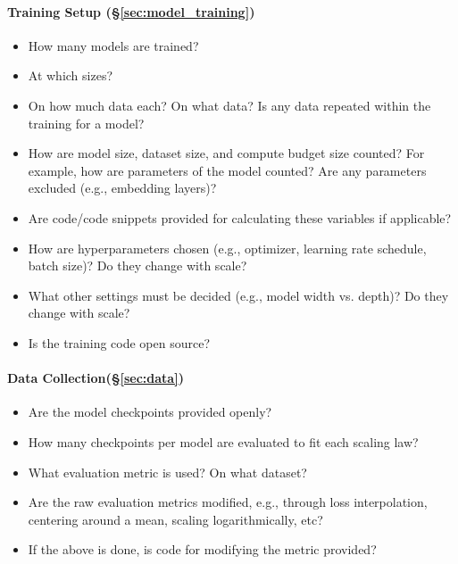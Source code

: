 {\begin{minipage}{38em}
\begin{minipage}[t]{0.48\textwidth}
\paragraph{Training Setup (\S\ref{sec:model_training})}
\begin{itemize}[leftmargin=*]
    \item How many models are trained?
    \item At which sizes?
    \item On how much data each? On what data? Is any data repeated within the training for a model?
    \item How are model size, dataset size, and compute budget size counted? For example, how are parameters of the model counted? Are any parameters excluded (e.g., embedding layers)?
    \item Are code/code snippets provided for calculating these variables if applicable?
    \item How are hyperparameters chosen (e.g., optimizer, learning rate schedule, batch size)? Do they change with scale?
    \item What other settings must be decided (e.g., model width vs. depth)? Do they change with scale?
    \item Is the training code open source?
\end{itemize}

\end{minipage}
\begin{minipage}[t]{0.48\textwidth}
\raggedright


\paragraph{Data Collection(\S\ref{sec:data})}
\begin{itemize}[leftmargin=*]
    \item Are the model checkpoints provided openly?
    \item How many checkpoints per model are evaluated to fit each scaling law?
    \item What evaluation metric is used? On what dataset?
    \item Are the raw evaluation metrics modified, e.g., through loss interpolation, centering around a mean, scaling logarithmically, etc?
    \item If the above is done, is code for modifying the metric provided? 
\end{itemize}


\end{minipage}
\end{minipage}}
